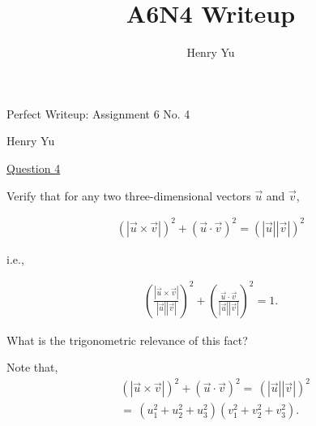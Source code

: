 \documentclass[12pt,a4paper]{article}
\author{Henry Yu}
\title{A6N4 Writeup}
\begin{document}
\begin{titlepage}
	
	\begin{center}

		\vspace*{\fill}

    	\vspace*{0.5cm}
	
	    \huge{Perfect Writeup: Assignment 6 No. 4}
	
	    \vspace*{0.5cm}
	
	    \large{Henry Yu}
	
    	\vspace*{\fill}

	\end{center}

\end{titlepage}

\newpage

\raggedright

\underline{Question 4}

\bigbreak


Verify that for any two three-dimensional vectors $\vec{u}$ and $\vec{v}$,
\begin{ceqn}
\begin{align*}
(|\vec{u} \times \vec{v}|)^{2}+(\vec{u} \cdot \vec{v})^{2}=(|\vec{u}||\vec{v}|)^{2}
\end{align*}
\end{ceqn}
i.e.,
\begin{ceqn}
\begin{align*}
\left(\frac{|\vec{u} \times \vec{v}|}{|\vec{u}||\vec{v}|}\right)^{2}+\left(\frac{\vec{u} \cdot \vec{v}}{|\vec{u}||\vec{v}|}\right)^{2}=1.
\end{align*}
\end{ceqn}

What is the trigonometric relevance of this fact?

\vspace{1cm}

Note that,
\begin{align*}
	&(|\vec{u} \times \vec{v}|)^{2}+(\vec{u} \cdot \vec{v})^{2}=\,(|\vec{u}||\vec{v}|)^{2}  \\
	&=\,(u_1^{2}+u_2^{2}+u_3^{2})(v_1^{2}+v_2^{2}+v_3^{2}). \\
\end{align*}

\vspace{-10pt}
\end{document}

